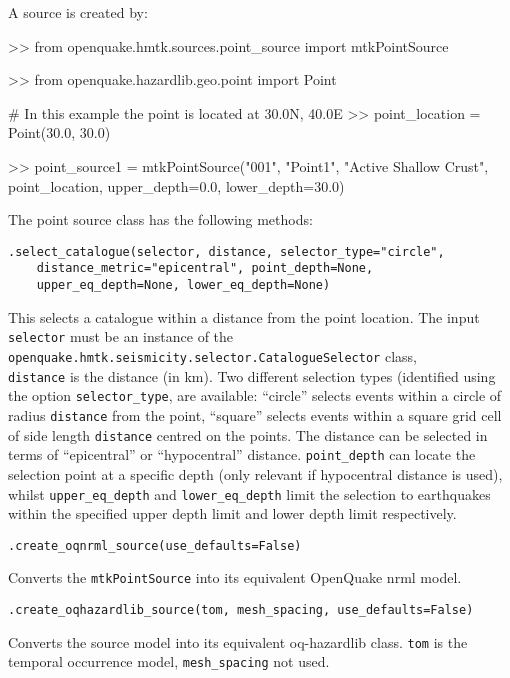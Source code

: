 A source is created by:

\begin{python}[frame=single]
>> from openquake.hmtk.sources.point_source import mtkPointSource

>> from openquake.hazardlib.geo.point import Point

# In this example the point is located at 30.0N, 40.0E
>> point_location = Point(30.0, 30.0)

>> point_source1 = mtkPointSource("001",
                                  "Point1",
                                  "Active Shallow Crust",
                                  point_location,
                                  upper_depth=0.0,
                                  lower_depth=30.0)
\end{python}

The point source class has the following methods:

\verb;.select_catalogue(selector, distance, selector_type="circle",;\\
\verb;    distance_metric="epicentral", point_depth=None,;\\
\verb;    upper_eq_depth=None, lower_eq_depth=None);

This selects a catalogue within a distance from the point location. The input \verb=selector= must be an instance of the \verb=openquake.hmtk.seismicity.selector.CatalogueSelector= class, \\ \verb=distance= is the distance (in km). Two different selection types (identified using the option \verb=selector_type=, are available: ``circle'' selects events within a circle of radius \verb=distance= from the point, ``square'' selects events within a square grid cell of side length \verb=distance= centred on the points. The distance can be selected in terms of ``epicentral'' or ``hypocentral'' distance. \verb=point_depth= can locate the selection point at a specific depth (only relevant if hypocentral distance is used), whilst \verb=upper_eq_depth= and \verb=lower_eq_depth= limit the selection to earthquakes within the specified upper depth limit and lower depth limit respectively. 


\verb;.create_oqnrml_source(use_defaults=False);

Converts the \verb=mtkPointSource= into its equivalent OpenQuake nrml model.

\verb;.create_oqhazardlib_source(tom, mesh_spacing, use_defaults=False);

Converts the source model into its equivalent oq-hazardlib class. \verb=tom= is the temporal occurrence model, \verb=mesh_spacing= not used.

